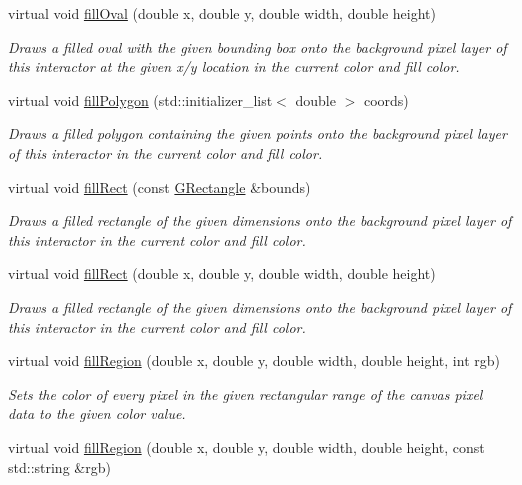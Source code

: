 \begin{DoxyCompactItemize}
virtual void \mbox{\hyperlink{classGDrawingSurface_a28c700c82f31cd328a4629273420ee61}{fill\+Oval}} (double x, double y, double width, double height)
\begin{DoxyCompactList}\small\item\em Draws a filled oval with the given bounding box onto the background pixel layer of this interactor at the given x/y location in the current color and fill color. \end{DoxyCompactList}\item 
virtual void \mbox{\hyperlink{classGDrawingSurface_a15f8c1c4409ef51c1a30a92a195b8f66}{fill\+Polygon}} (std\+::initializer\+\_\+list$<$ double $>$ coords)
\begin{DoxyCompactList}\small\item\em Draws a filled polygon containing the given points onto the background pixel layer of this interactor in the current color and fill color. \end{DoxyCompactList}\item 
virtual void \mbox{\hyperlink{classGDrawingSurface_ae6582295003bf2488836b1993dadbad7}{fill\+Rect}} (const \mbox{\hyperlink{classGRectangle}{G\+Rectangle}} \&bounds)
\begin{DoxyCompactList}\small\item\em Draws a filled rectangle of the given dimensions onto the background pixel layer of this interactor in the current color and fill color. \end{DoxyCompactList}\item 
virtual void \mbox{\hyperlink{classGDrawingSurface_aac3ae7d3aee950de78eca0e108352254}{fill\+Rect}} (double x, double y, double width, double height)
\begin{DoxyCompactList}\small\item\em Draws a filled rectangle of the given dimensions onto the background pixel layer of this interactor in the current color and fill color. \end{DoxyCompactList}\item 
virtual void \mbox{\hyperlink{classGCanvas_af4146bdcb26135b739b9b4f13db03435}{fill\+Region}} (double x, double y, double width, double height, int rgb)
\begin{DoxyCompactList}\small\item\em Sets the color of every pixel in the given rectangular range of the canvas pixel data to the given color value. \end{DoxyCompactList}\item 
virtual void \mbox{\hyperlink{classGCanvas_a762c611a5065687112018e7a0ab10c84}{fill\+Region}} (double x, double y, double width, double height, const std\+::string \&rgb)

\end{DoxyCompactItemize}
